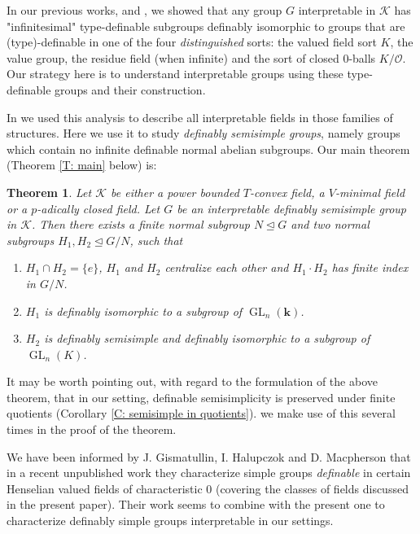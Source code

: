 \documentclass[11pt]{amsart}
\DeclareMathOperator{\gl}{GL} \DeclareMathOperator{\agl}{AGL}
\newtheorem{introtheorem}{Theorem}
\theoremstyle{definition}
\newcommand{\bk}{\textbf{k}}
\newcommand{\CK}{{\mathcal K}}
\newcommand{\CO}{{\mathcal O}}
\newcommand{\0}{\emptyset}
\begin{document}
In our previous works, \cite{HaHaPeGps} and \cite{HaHaPeVF}, we showed that any group $G$ interpretable in $\CK$ has "infinitesimal" type-definable subgroups definably isomorphic to groups that are (type)-definable in one of the four {\em distinguished} sorts: the valued field sort $K$, the value group, the residue field (when infinite) and the sort of closed $0$-balls $K/\CO$.  Our strategy here is to understand interpretable groups using these type-definable groups and their construction.




In \cite{HaHaPeVF} we used this analysis to describe all interpretable fields in those families of structures. 
Here we use it to study {\em definably semisimple groups}, namely groups which contain no infinite definable normal abelian subgroups. Our main theorem (Theorem \ref{T: main} below) is:


\begin{introtheorem}\label{T: intro}
    Let $\CK$ be either a power bounded $T$-convex field, a $V$-minimal field or a $p$-adically closed field. Let $G$ be an interpretable definably semisimple group in $\CK$. Then there exists a finite normal subgroup $N\trianglelefteq G$ and two normal subgroups $H_1,H_2\trianglelefteq G/N$, such that 
    \begin{enumerate}
        \item $H_1\cap H_2=\{e\}$, $H_1$ and $H_2$ centralize each other and $H_1\cdot H_2$ has finite index in $G/N$.
               \item $H_1$ is definably isomorphic to a subgroup of $\gl_n(\bk)$.
     \item $H_2$ is definably semisimple and definably isomorphic to a subgroup of $\gl_n(K)$.
    \end{enumerate}
\end{introtheorem}



It may be worth pointing out, with regard to the formulation of the above theorem, that in our setting,  definable semisimplicity is preserved under finite quotients (Corollary \ref{C: semisimple in quotients}). we make use of this several times in the proof of the theorem. 

We have been informed by J. Gismatullin,  I. Halupczok and D. Macpherson that in a recent unpublished work \cite{GisHalMac} they characterize simple groups \emph{definable}  in certain Henselian valued fields of characteristic $0$ (covering the classes of fields discussed in the present paper).  Their work seems to combine with the present one to characterize definably simple groups interpretable in our settings. 
\end{document}
